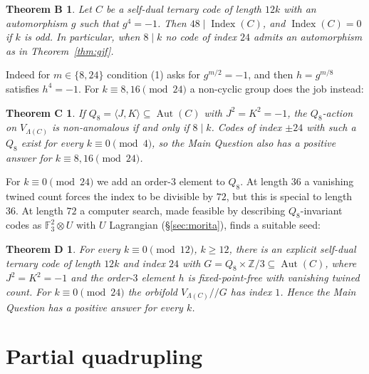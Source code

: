 \documentclass[11pt]{amsart}
\newtheorem*{thmB}{Theorem B}
\newtheorem*{thmC}{Theorem C}
\newtheorem*{thmD}{Theorem D}
\theoremstyle{definition}
\newcommand{\F}{\mathbb{F}_3}
\newcommand{\Index}{\operatorname{Index}}
\newcommand{\Aut}{\operatorname{Aut}}
\begin{document}
\begin{thmB}
Let $C$ be a self-dual ternary code of length $12k$ with an automorphism $g$ such that
$g^4=-1$. Then $48\mid\Index(C)$, and $\Index(C)=0$ if $k$ is odd. In particular, when $8\mid k$
no code of index $24$ admits an automorphism as in Theorem~\ref{thm:gjf}.
\end{thmB}

Indeed for $m\in\{8,24\}$ condition (1) asks for $g^{m/2}=-1$, and then $h=g^{m/8}$ satisfies
$h^4=-1$. For $k\equiv8,16\pmod{24}$ a non-cyclic group does the job instead:

\begin{thmC}
If $Q_8=\langle J,K\rangle\subseteq\Aut(C)$ with $J^2=K^2=-1$, the $Q_8$-action on $V_{\Lambda(C)}$ is
non-anomalous if and only if $8\mid k$. Codes of index $\pm24$ with such a $Q_8$ exist for every
$k\equiv0\pmod4$, so the Main Question also has a positive answer for $k\equiv8,16\pmod{24}$.
\end{thmC}

For $k\equiv0\pmod{24}$ we add an order-$3$ element to $Q_8$. At length $36$ a vanishing twined count forces
the index to be divisible by $72$, but this is special to length $36$. At length $72$ a computer search,
made feasible by describing $Q_8$-invariant codes as $\F^2\otimes U$ with $U$ Lagrangian (\S\ref{sec:morita}),
finds a suitable seed:

\begin{thmD}
For every $k\equiv0\pmod{12}$, $k\ge12$, there is an explicit self-dual ternary code of length $12k$ and
index $24$ with $G=Q_8\times\mathbb Z/3\subseteq\Aut(C)$, where $J^2=K^2=-1$ and the order-$3$ element $h$ is
fixed-point-free with vanishing twined count. For $k\equiv0\pmod{24}$ the orbifold $V_{\Lambda(C)}/\!\!/G$ has
index $1$. Hence the Main Question has a positive answer for every $k$.
\end{thmD}

\section{Partial quadrupling}\label{sec:Q}
\end{document}
